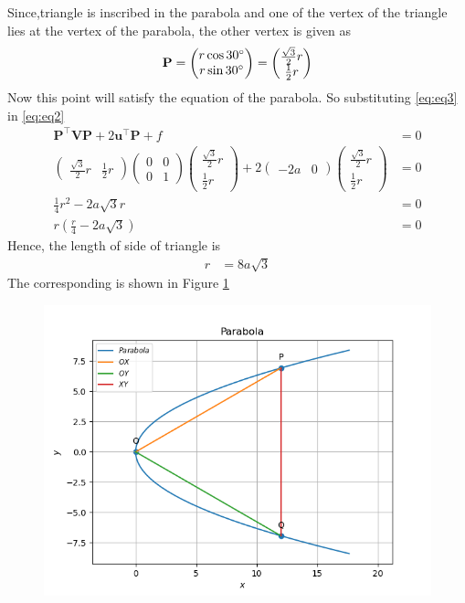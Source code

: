 \documentclass[12pt]{article}
\providecommand{\brak}[1]{\ensuremath{\left(#1\right)}}
\newcommand{\myvec}[1]{\ensuremath{\begin{pmatrix}#1\end{pmatrix}}}
\let\vec\mathbf
\begin{document}
Since,triangle is inscribed in the parabola and one of the vertex of the triangle lies at the vertex of the parabola, the other vertex is given as
\begin{align}
	\label{eq:eq3}
	\vec{P} = \myvec{r\cos 30\degree\\r\sin 30\degree} = \myvec{\frac{\sqrt{3}}{2}r\\\frac{1}{2}r}
\end{align}
Now this point will satisfy the equation of the parabola. So substituting \eqref{eq:eq3} in \eqref{eq:eq2}
\begin{align}
	\vec{P}^\top \vec{V}\vec{P}+2\vec{u}^\top \vec{P}+f&=0\\
	\myvec{\frac{\sqrt{3}}{2}r&\frac{1}{2}r}\myvec{0&0\\0&1}\myvec{\frac{\sqrt{3}}{2}r\\\frac{1}{2}r}+2\myvec{-2a&0}\myvec{\frac{\sqrt{3}}{2}r\\\frac{1}{2}r} &= 0\\
	\frac{1}{4}r^2 - 2a\sqrt{3}r &= 0\\
	r\brak{\frac{r}{4} - 2a\sqrt{3}} &= 0
\end{align}
Hence, the length of side of triangle is
\begin{align}
	r &= 8a\sqrt{3}
\end{align}
The corresponding is shown in Figure \ref{fig:Fig1}
\begin{figure}[!h]
	\begin{center} 
	    \includegraphics[width=\columnwidth]{figs/conic5}
	\end{center}
\caption{}
\label{fig:Fig1}
\end{figure}
\end{document}

